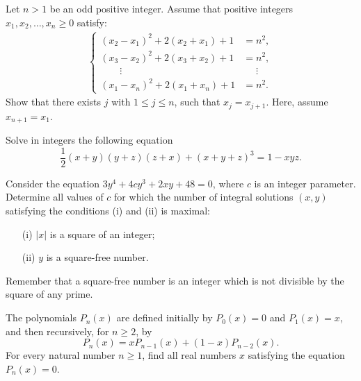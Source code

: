\documentclass[12pt,a4paper]{memoir}
\theoremstyle{definition}
\begin{document}
\begin{question}[name={1994 Austrian--Polish}]
	Let $n > 1$ be an odd positive integer. Assume that positive integers $x_1, x_2,\dots, x_n \ge 0$ satisfy:
	\begin{align*}
		\begin{cases}
			(x_2 - x_1)^2 + 2(x_2 +x_1) + 1 &= n^2,\\
			(x_3 -x_2)^2 + 2(x_3 +x_2) + 1 &= n^2,\\
			\qquad \vdots &\phantom{=} \vdots\\
			(x_1 - x_n)^2 + 2(x_1 + x_n)+ 1 &= n^2.
		\end{cases}
	\end{align*}
	Show that there exists $j$ with $1 \le j \le n$, such that $x_j = x_{j+1}$. Here, assume $x_{n+1} = x_1$.
\end{question}




\begin{question}[name={1994 Austrian--Polish}]
	Solve in integers the following equation
	\[\frac{1}{2}(x + y)(y + z)(z + x) + (x + y + z)^3 = 1 - xyz.\]
\end{question}




\begin{question}[name={1995 Austrian--Polish}]
	Consider the equation $3y^4 + 4cy^3 + 2xy + 48 = 0$, where $c$ is an integer parameter. Determine all values of $c$ for which the number of integral solutions $(x,y)$ satisfying the conditions (i) and (ii) is maximal:
	\begin{itemize}
		\item[(i)] $|x|$ is a square of an integer;
		\item[(ii)] $y$ is a square-free number.
	\end{itemize}
	Remember that a square-free number is an integer which is not divisible by the square of any prime.
\end{question}




\begin{question}[name={1996 Austrian--Polish}]
	The polynomials $P_{n}(x)$ are defined initially by $P_{0}(x)=0$ and $P_{1}(x)=x$, and then recursively, for $n\geq 2$, by
	\[P_{n}(x)=xP_{n-1}(x)+(1-x)P_{n-2}(x).\] For every natural number $n\geq 1$, find all real numbers $x$ satisfying the equation $P_{n}(x)=0$.
\end{question}
\end{document}

